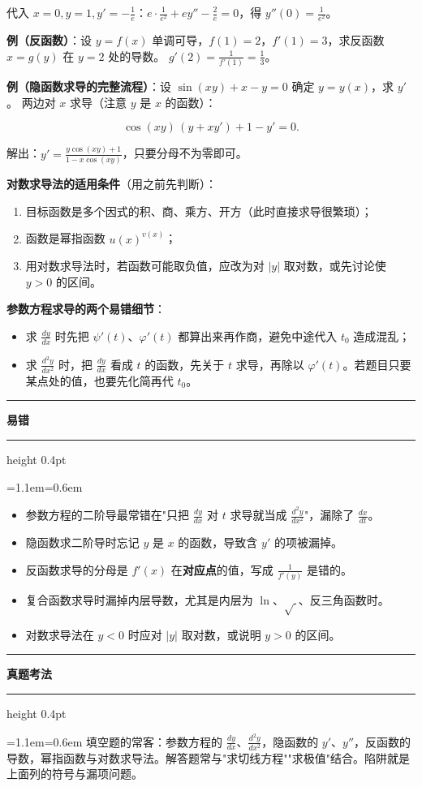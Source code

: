 \documentclass[11pt,openany,UTF8]{ctexbook}
\newcommand{\callouthead}[2]{%
  \par\addvspace{7pt}\noindent
  {\color{#1}\rule[-0.15em]{3pt}{1.05em}}\hspace{0.5em}%
  {\bfseries\color{#1}#2}\par\nobreak\vspace{-0.35em}%
  {\color{rulesep}\hrule height 0.4pt}\nobreak\vspace{0.45em}%
  \begingroup\small\setlength{\parindent}{0pt}%
  \leftskip=1.1em\rightskip=0.6em\noindent\ignorespaces}
\newcommand{\calloutend}{\par\endgroup\addvspace{7pt}}
\newenvironment{callwarn}[1]{\callouthead{warnbar}{#1}}{\calloutend}
\newenvironment{callexam}[1]{\callouthead{exambar}{#1}}{\calloutend}
\begin{document}
代入 $x=0,y=1,y'=-\frac1e$：$e\cdot\frac{1}{e^2}+ey''-\frac2e=0$，得 $y''(0)=\frac{1}{e^2}$。

\textbf{例（反函数）}：设 $y=f(x)$ 单调可导，$f(1)=2$，$f'(1)=3$，求反函数 $x=g(y)$ 在 $y=2$ 处的导数。 $g'(2)=\frac{1}{f'(1)}=\frac13$。

\textbf{例（隐函数求导的完整流程）}：设 $\sin(xy)+x-y=0$ 确定 $y=y(x)$，求 $y'$。 两边对 $x$ 求导（注意 $y$ 是 $x$ 的函数）：

\[\cos(xy)\,(y+xy')+1-y'=0 .\]

解出：$y'=\frac{y\cos(xy)+1}{1-x\cos(xy)}$，只要分母不为零即可。

\textbf{对数求导法的适用条件}（用之前先判断）：

\begin{enumerate}
\item 目标函数是多个因式的积、商、乘方、开方（此时直接求导很繁琐）；
\item 函数是幂指函数 $u(x)^{v(x)}$；
\item 用对数求导法时，若函数可能取负值，应改为对 $|y|$ 取对数，或先讨论使 $y>0$ 的区间。
\end{enumerate}
\textbf{参数方程求导的两个易错细节}：

\begin{itemize}
\item 求 $\frac{dy}{dx}$ 时先把 $\psi'(t)$、$\varphi'(t)$ 都算出来再作商，避免中途代入 $t_0$ 造成混乱；
\item 求 $\frac{d^2y}{dx^2}$ 时，把 $\frac{dy}{dx}$ 看成 $t$ 的函数，先关于 $t$ 求导，再除以 $\varphi'(t)$。若题目只要某点处的值，也要先化简再代 $t_0$。
\end{itemize}
\begin{callwarn}{易错}
\begin{itemize}
\item 参数方程的二阶导最常错在"只把 $\frac{dy}{dx}$ 对 $t$ 求导就当成 $\frac{d^2y}{dx^2}$"，漏除了 $\frac{dx}{dt}$。
\item 隐函数求二阶导时忘记 $y$ 是 $x$ 的函数，导致含 $y'$ 的项被漏掉。
\item 反函数求导的分母是 $f'(x)$ 在\textbf{对应点}的值，写成 $\frac{1}{f'(y)}$ 是错的。
\item 复合函数求导时漏掉内层导数，尤其是内层为 $\ln$、$\sqrt{\ }$、反三角函数时。
\item 对数求导法在 $y<0$ 时应对 $|y|$ 取对数，或说明 $y>0$ 的区间。
\end{itemize}
\end{callwarn}

\begin{callexam}{真题考法}
填空题的常客：参数方程的 $\frac{dy}{dx}$、$\frac{d^2y}{dx^2}$，隐函数的 $y'$、$y''$，反函数的导数，幂指函数与对数求导法。解答题常与"求切线方程""求极值"结合。陷阱就是上面列的符号与漏项问题。

\end{callexam}
\end{document}
